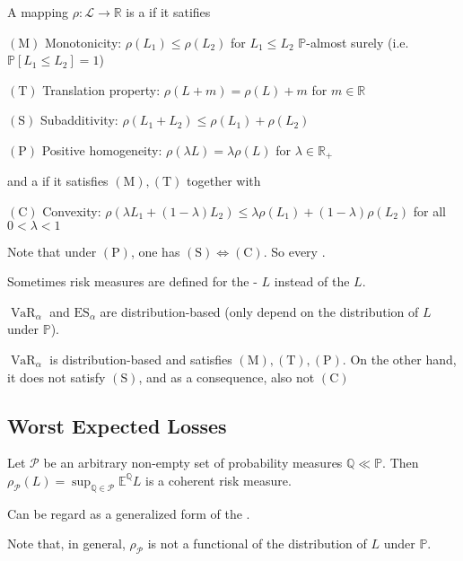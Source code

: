 A mapping $\rho: \mathcal{L} \rightarrow \mathbb{R}$ is a  if it satifies

$(\mathrm{M})$ Monotonicity: $\rho\left(L_{1}\right) \leq \rho\left(L_{2}\right)$ for $L_{1} \leq L_{2}$ $\mathbb{P}$-almost surely (i.e. $\mathbb{P}\left[L_{1} \leq L_{2}\right]=1$)

$(\mathrm{T})$ Translation property: $\rho(L+m)=\rho(L)+m$ for $m \in \mathbb{R}$

$(\mathrm{S})$ Subadditivity: $\rho\left(L_{1}+L_{2}\right) \leq \rho\left(L_{1}\right)+\rho\left(L_{2}\right)$

$(\mathrm{P})$ Positive homogeneity: $\rho(\lambda L)=\lambda \rho(L)$ for $\lambda \in \mathbb{R}_{+}$

and a  if it satisfies $(\mathrm{M}),(\mathrm{T})$ together with

$(\mathrm{C})$ Convexity: $\rho\left(\lambda L_{1}+(1-\lambda) L_{2}\right) \leq \lambda \rho\left(L_{1}\right)+(1-\lambda) \rho\left(L_{2}\right)$ for all $0<\lambda<1$

Note that under $(\mathrm{P})$, one has $(\mathrm{S}) \Leftrightarrow(\mathrm{C})$. So every .

Sometimes risk measures are defined for the  - $L$ instead of the  $L$.

$\operatorname{VaR}_{\alpha}$ and $\mathrm{ES}_{\alpha}$ are distribution-based (only depend on the distribution of $L$ under $\mathbb{P}$).

$\operatorname{VaR}_{\alpha}$ is distribution-based and satisfies $(\mathrm{M}),(\mathrm{T}),(\mathrm{P})$. On the other hand, it does not satisfy $(\mathrm{S})$, and as a consequence, also not $(\mathrm{C})$







\subsection*{Worst Expected Losses}
Let $\mathcal{P}$ be an arbitrary non-empty set of probability measures $\mathbb{Q} \ll \mathbb{P}$. Then $
\displaystyle \rho_{\mathcal{P}}(L)=\sup _{\mathbb{Q} \in \mathcal{P}} \mathbb{E}^{\mathbb{Q}} L
$ is a coherent risk measure.

Can be regard as a generalized form of the .

Note that, in general, $\rho_{\mathcal{P}}$ is not a functional of the distribution of $L$ under $\mathbb{P}$.


